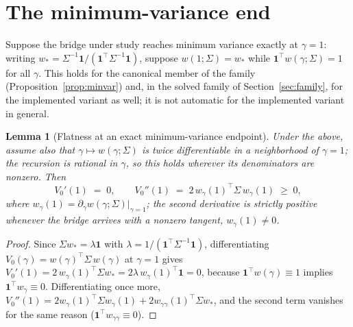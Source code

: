 \documentclass[11pt]{article}
\newtheorem{lemma}{Lemma}
\theoremstyle{remark}
\begin{document}
\section{The minimum-variance end}
\label{sec:mvend}

Suppose the bridge under study reaches minimum variance exactly at
$\gamma = 1$: writing
$w_* = \Sigma^{-1}\mathbf{1}/(\mathbf{1}^\top\Sigma^{-1}\mathbf{1})$,
suppose $w(1;\Sigma) = w_*$ while $\mathbf{1}^\top w(\gamma;\Sigma) = 1$ for
all $\gamma$. This holds for the canonical member of the family
(Proposition~\ref{prop:minvar}) and, in the solved family of
Section~\ref{sec:family}, for the implemented variant as well; it is not
automatic for the implemented variant in general.

\begin{lemma}[Flatness at an exact minimum-variance endpoint]
\label{lem:mv}
Under the above, assume also that $\gamma \mapsto w(\gamma;\Sigma)$ is
twice differentiable in a neighborhood of $\gamma = 1$; the recursion is
rational in $\gamma$, so this holds wherever its denominators are nonzero.
Then
\[
  V_0'(1) \;=\; 0,
  \qquad
  V_0''(1) \;=\; 2\, w_\gamma(1)^\top \Sigma\, w_\gamma(1) \;\ge\; 0,
\]
where $w_\gamma(1) = \partial_\gamma w(\gamma;\Sigma)|_{\gamma=1}$; the
second derivative is strictly positive whenever the bridge arrives with a
nonzero tangent, $w_\gamma(1) \ne 0$.
\end{lemma}
\begin{proof}
Since $\Sigma w_* = \lambda \mathbf{1}$ with
$\lambda = 1/(\mathbf{1}^\top\Sigma^{-1}\mathbf{1})$, differentiating
$V_0(\gamma) = w(\gamma)^\top\Sigma\,w(\gamma)$ at $\gamma = 1$ gives
$V_0'(1) = 2\, w_\gamma(1)^\top \Sigma w_* = 2\lambda\,
w_\gamma(1)^\top \mathbf{1} = 0$, because $\mathbf{1}^\top w(\gamma) \equiv 1$
implies $\mathbf{1}^\top w_\gamma \equiv 0$. Differentiating once more,
$V_0''(1) = 2 w_\gamma(1)^\top \Sigma w_\gamma(1) +
2 w_{\gamma\gamma}(1)^\top \Sigma w_*$, and the second term vanishes for the
same reason ($\mathbf{1}^\top w_{\gamma\gamma} \equiv 0$).
\end{proof}
\end{document}

